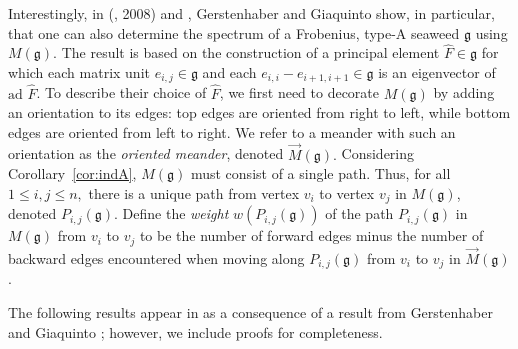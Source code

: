 \documentclass[letterpaper,10pt]{article}
\begin{document}
Interestingly, in (\textbf{\cite{GG2}}, 2008) and \textbf{\cite{GG3}}, Gerstenhaber and Giaquinto show, in particular, that one can also determine the spectrum of a Frobenius, type-A seaweed $\mathfrak{g}$ using $M(\mathfrak{g})$. The result is based on the construction of a principal element $\widehat{F}\in\mathfrak{g}$ for which each matrix unit $e_{i,j}\in\mathfrak{g}$ and each $e_{i,i}-e_{i+1,i+1}\in\mathfrak{g}$ is an eigenvector of $\text{ad }\widehat{F}$. To describe their choice of $\widehat{F}$, we first need to decorate $M(\mathfrak{g})$ by adding an orientation to its edges: top edges are oriented from right to left, while bottom edges are oriented from left to right. We refer to a meander with such an orientation as the \textit{oriented meander}, denoted $\overrightarrow{M}(\mathfrak{g}).$ Considering Corollary~\ref{cor:indA}, $M(\mathfrak{g})$ must consist of a single path. Thus, for all $1\leq i,j\leq n,$ there is a unique path from vertex $v_i$ to vertex $v_j$ in $M(\mathfrak{g})$, denoted $P_{i,j}(\mathfrak{g})$. Define the \textit{weight} $w(P_{i,j}(\mathfrak{g}))$ of the path $P_{i,j}(\mathfrak{g})$ in $M(\mathfrak{g})$ from $v_i$ to $v_j$ to be the number of forward edges minus the number of backward edges encountered when moving along $P_{i,j}(\mathfrak{g})$ from $v_i$ to $v_j$ in $\overrightarrow{M}(\mathfrak{g})$.

The following results appear in \textbf{\cite{unbroken}} as a consequence of a result from Gerstenhaber and Giaquinto \textbf{\cite{GG2}}; however, we include proofs for completeness.
\end{document}
